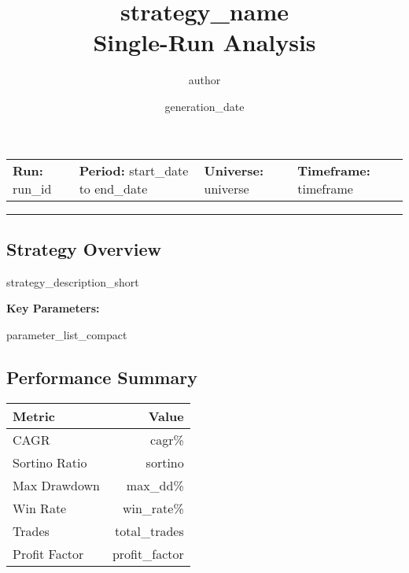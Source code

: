 \documentclass[11pt,a4paper]{article}
\title{\textbf{{{strategy_name}}} \\[0.2em] \large Single-Run Analysis}
\author{{{author}}}
\date{{{generation_date}}}
\begin{document}
\maketitle
\vspace{-0.5em}

\begin{center}
\small
\begin{tabular}{llll}
\textbf{Run:} {{run_id}} & \textbf{Period:} {{start_date}} to {{end_date}} & \textbf{Universe:} {{universe}} & \textbf{Timeframe:} {{timeframe}} \\
\end{tabular}
\end{center}

\vspace{-0.3em}
\hrule
\vspace{0.3em}

\begin{multicols}{2}

\subsection*{Strategy Overview}
\small
{{strategy_description_short}}

\textbf{Key Parameters:}
\begin{itemize}
\setlength\itemsep{0em}
{{parameter_list_compact}}
\end{itemize}

\subsection*{Performance Summary}
\small
\begin{tabular}{lr}
\toprule
\textbf{Metric} & \textbf{Value} \\
\midrule
CAGR & {{cagr}}\% \\
Sortino Ratio & {{sortino}} \\
Max Drawdown & {{max_dd}}\% \\
Win Rate & {{win_rate}}\% \\
Trades & {{total_trades}} \\
Profit Factor & {{profit_factor}} \\
\bottomrule
\end{tabular}

\end{multicols}
\end{document}
